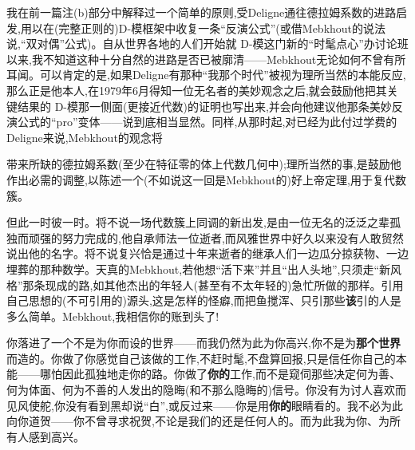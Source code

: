 \noindent 我在前一篇注(b)部分中解释过一个简单的原则,受Deligne通往德拉姆系数的进路启发,用以在(完整正则的)D-模框架中收复一条“反演公式”(或借Mebkhout的说法\dmark{}说,“双对偶”公式)。自从世界各地的人们开始就 D-模这门新的“时髦点心”办讨论班以来,我不知道这种十分自然的进路是否已被廓清——Mebkhout无论如何不曾有所耳闻。可以肯定的是,如果Deligne有那种“我那个时代”被视为理所当然的本能反应,那么正是他本人,在1979年6月得知一位无名者的美妙观念之后,就会鼓励他把其关键结果的 D-模那一侧面(更接近代数)的证明也写出来,并会向他建议他那条美妙反演公式的“pro”变体——说到底相当显然。同样,从那时起,对已经为此付过学费的Deligne来说,Mebkhout的观念将

带来所缺的德拉姆系数(至少在特征零的体上代数几何中);理所当然的事,是鼓励他作出必需的调整,以陈述一个(不如说这一回是Mebkhout的)好上帝定理,用于复代数簇。

\noindent 但此一时彼一时。将不说一场代数簇上同调的新出发,是由一位无名的泛泛之辈孤独而顽强的努力完成的,他自承师法一位逝者,而风雅世界中好久以来没有人敢贸然说出他的名字。将不说复兴恰是通过十年来逝者的继承人们一边瓜分掠获物、一边埋葬的那种数学。天真的Mebkhout,若他想“活下来”\dmark{}并且“出人头地”,只须走“新风格”那条现成的路,如其他杰出的年轻人(甚至有不太年轻的)急忙所做的那样。引用自己思想的(不可引用的)源头,这是怎样的怪癖,而把鱼搅浑、只引那些\textbf{该}引的人是多么简单。Mebkhout,我相信你的账到头了!

\noindent 你落进了一个不是为你而设的世界——而我仍然为此为你高兴,你不是为\textbf{那个世界}而造的。你做了你感觉自己该做的工作,不赶时髦,不盘算回报,只是信任你自己的本能——哪怕因此孤独地走你的路。你做了\textbf{你的}工作,而不是窥伺那些决定何为善、何为体面、何为不善的人发出的隐晦(和不那么隐晦的)信号。你没有为讨人喜欢而见风使舵,你没有看到黑却说“白”,或反过来——你是用\textbf{你的}眼睛看的。我不必为此向你道贺——你不曾寻求祝贺,不论是我们的还是任何人的。而为此我为你、为所有人感到高兴。

